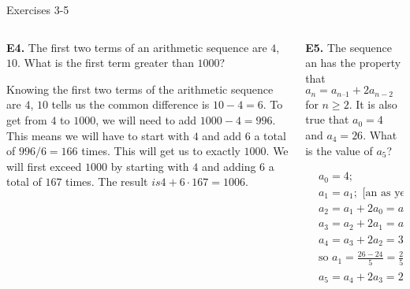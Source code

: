 \documentclass[9pt,aspectratio=169]{beamer}
\begin{document}
\begin{frame}{Exercises 3-5}
  \begin{columns}[T]
    \begin{column}{0.5\textwidth}
      \begin{problem}
        \textbf{E4.} The first two terms of an arithmetic sequence are $4$, $10$. What is the first term greater
        than $1000$?
      \end{problem}
      Knowing the first two terms of the arithmetic sequence are $4$, $10$ tells us the common difference is $10 - 4 = 6$. To get from $4$ to $1000$, we will need to add $1000 - 4 = 996$. This means we will have to start with $4$ and add $6$ a total of $996 / 6 = 166$ times. This will get us to exactly
      $1000$. We will first exceed $1000$ by starting with $4$ and adding $6$ a total of $167$ times. The result $is 4 + 6 \cdot 167 = \boxed{1006}$.
    \end{column}
    \begin{column}{0.5\textwidth}
      \begin{problem}
        \textbf{E5.} The sequence an has the property that $a_{n} = a_{n – 1} + 2a_{n-2}$ for $n \geq 2$. It is also
        true that $a_0 = 4$ and $a_4 = 26$. What is the value of $a_{5}$?
      \end{problem}
      \begin{align*}    
        &a_0 = 4;\\
        &a_1 = a_1; \text{ [an as yet unknown value]}\\
        &a_2 = a_1 + 2a_0 = a_1 + 8;\\
        &a_3 = a_2 + 2a_1 = a_1 + 8 + 2a_1 = 3a_1 + 8;\\
        &a_4 = a_3 + 2a_2 = 3a_1 + 8 + 2(a_1 + 8) = 5a_1 + 24 = 26,\\
        &\text{so } a_1 = \frac{26-24}{5} = \frac{2}{5} \text{ and } a_3 = \frac{6}{5} + 8 = \frac{46}{5};\\
        &a_5 = a_4 + 2a_3 = 26 + 2 \times \frac{46}{5} = \frac{130+92}{5} = \boxed{\frac{222}{5}}.
      \end{align*}
    \end{column}
  \end{columns}
\end{frame}
\end{document}
